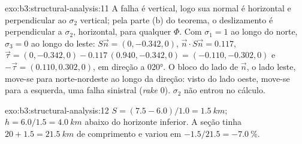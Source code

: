 \begin{solution}{exo:b3:structural-analysis:11}
A falha é vertical, logo sua normal é horizontal e perpendicular ao
$\sigma_2$ vertical; pela parte (b) do teorema, o deslizamento é perpendicular a
$\sigma_2$, horizontal, para qualquer $\Phi$. Com $\sigma_1 = 1$ ao longo do norte,
$\sigma_3 = 0$ ao longo do leste: $S\vec n = (0, -0.342, 0)$, $\vec n\cdot S\vec n =
0.117$, $\vec\tau = (0, -0.342, 0) - 0.117\,(0.940, -0.342, 0) = (-0.110,
-0.302, 0)$ e $-\vec\tau = (0.110, 0.302, 0)$, em direção a \ang{020}. O bloco
do lado de $\vec n$, o lado leste, move-se para norte-nordeste ao longo da
direção: visto do lado oeste, move-se para a esquerda, uma falha sinistral (\textit{rake}
0). $\sigma_2$ não entrou no cálculo.
\end{solution}

\begin{solution}{exo:b3:structural-analysis:12}
$S = (7.5 - 6.0)/1.0 = \qty{1.5}{km}$; $h = 6.0/1.5 = \qty{4.0}{km}$ abaixo do
horizonte inferior. A seção tinha $20 + 1.5 = \qty{21.5}{km}$ de comprimento e
variou em $-1.5/21.5 = \qty{-7.0}{\percent}$.
\end{solution}

